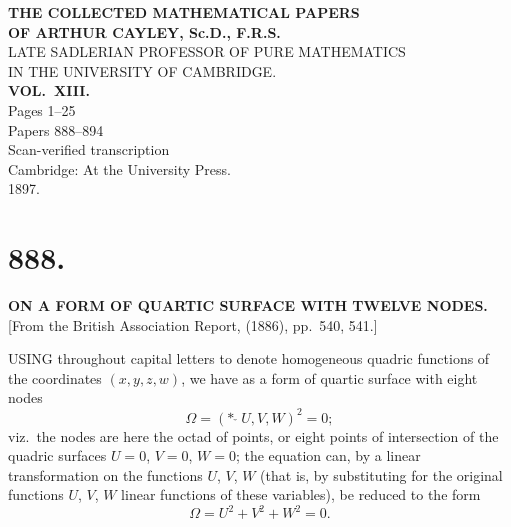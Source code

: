 \documentclass[11pt,a4paper]{article}
\begin{document}
\begin{titlepage}
\centering
\vspace*{2cm}
{\LARGE\bfseries THE COLLECTED MATHEMATICAL PAPERS\\[0.5em] OF ARTHUR CAYLEY, Sc.D., F.R.S.\\[1em]}
{\Large LATE SADLERIAN PROFESSOR OF PURE MATHEMATICS\\ IN THE UNIVERSITY OF CAMBRIDGE.\\[2em]}
{\LARGE\bfseries VOL.\ XIII.\\[2em]}
{\large Pages 1--25\\[0.5em] Papers 888--894\\[2em]}
{\large Scan-verified transcription\\[3em]}
\vfill
{\large Cambridge: At the University Press.\\ 1897.\\[1em]}
\end{titlepage}

\thispagestyle{empty}
\clearpage
\setcounter{page}{1}


\section*{888.}
\begin{center}
{\large\bfseries ON A FORM OF QUARTIC SURFACE WITH TWELVE NODES.}\\[0.5em]
\small [From the British Association Report, (1886), pp.\ 540, 541.]
\end{center}

USING throughout capital letters to denote homogeneous quadric functions of the coordinates $(x, y, z, w)$, we have as a form of quartic surface with eight nodes
\[
\Omega = (*\,\check{\,}\, U, V, W)^2 = 0;
\]
viz.\ the nodes are here the octad of points, or eight points of intersection of the quadric surfaces $U=0$, $V=0$, $W=0$; the equation can, by a linear transformation on the functions $U$, $V$, $W$ (that is, by substituting for the original functions $U$, $V$, $W$ linear functions of these variables), be reduced to the form
\[
\Omega = U^2 + V^2 + W^2 = 0.
\]
\end{document}
